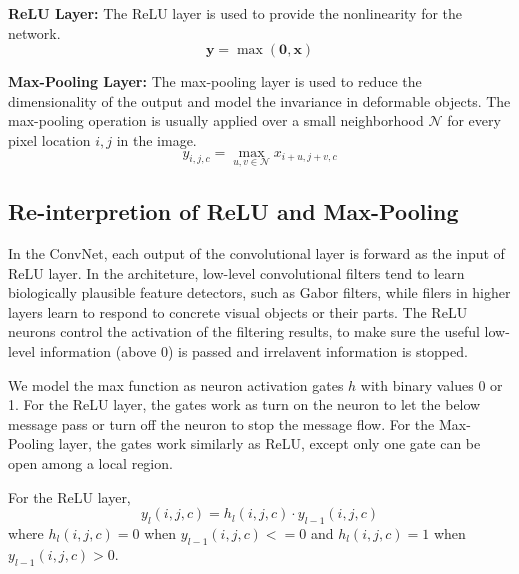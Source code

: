 \textbf{ReLU Layer:}
The ReLU layer is used to provide the nonlinearity for the network.
\begin{equation}
\mathbf{y} = \max (\mathbf{0}, \mathbf{x})
\end{equation} 

\textbf{Max-Pooling Layer:}
The max-pooling layer is used to reduce the dimensionality of the output and model the invariance in deformable objects. The max-pooling operation is usually applied over a small neighborhood $\mathcal{N}$ for every pixel location $i,j$ in the image.
\begin{equation}
y_{i,j,c} = \max_{u,v \in \mathcal{N}} x_{i+u, j+v, c}
\end{equation}

\subsection{Re-interpretion of ReLU and Max-Pooling}
In the ConvNet, each output of the convolutional layer is forward as the input of ReLU layer. In the architeture, low-level convolutional filters tend to learn biologically plausible feature detectors, such as Gabor filters, while filers in higher layers learn to respond to concrete visual objects or their parts. The ReLU neurons control the activation of the filtering results, to make sure the useful low-level information (above 0) is passed and irrelavent information is stopped.

We model the max function as neuron activation gates $h$ with binary values 0 or 1. For the ReLU layer, the gates work as turn on the neuron to let the below message pass or turn off the neuron to stop the message flow. For the Max-Pooling layer, the gates work similarly as ReLU, except only one gate can be open among a local region.

For the ReLU layer, 
\begin{equation}
y_l(i,j,c) = h_l(i,j,c) \cdot y_{l-1}(i,j,c)
\end{equation} 
where $h_l(i,j,c) = 0$ when $y_{l-1}(i,j,c) <= 0$ and $h_l(i,j,c) = 1$ when $y_{l-1}(i,j,c) > 0$.

